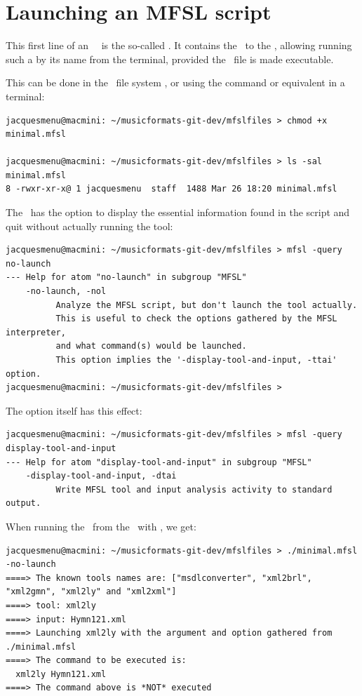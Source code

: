 \section{Launching an MFSL script}

This first line of an \mfslLang\ \script\ is the so-called . It contains the \filePath\ to the \mfslInterp, allowing running such a \script by its name from the terminal, provided the \script\ file is made executable.

This can be done in the \OS\ file system \GUI, or using the  command or equivalent in a terminal:
\begin{lstlisting}[language=Terminal]
jacquesmenu@macmini: ~/musicformats-git-dev/mfslfiles > chmod +x minimal.mfsl

jacquesmenu@macmini: ~/musicformats-git-dev/mfslfiles > ls -sal minimal.mfsl
8 -rwxr-xr-x@ 1 jacquesmenu  staff  1488 Mar 26 18:20 minimal.mfsl
\end{lstlisting}

The \mfslInterp\ has the  option to display the essential information found in the script and quit without actually running the tool:
\begin{lstlisting}[language=Terminal]
jacquesmenu@macmini: ~/musicformats-git-dev/mfslfiles > mfsl -query no-launch
--- Help for atom "no-launch" in subgroup "MFSL"
    -no-launch, -nol
          Analyze the MFSL script, but don't launch the tool actually.
          This is useful to check the options gathered by the MFSL interpreter,
          and what command(s) would be launched.
          This option implies the '-display-tool-and-input, -ttai' option.
jacquesmenu@macmini: ~/musicformats-git-dev/mfslfiles >
\end{lstlisting}

The  option itself has this effect:
\begin{lstlisting}[language=Terminal]
jacquesmenu@macmini: ~/musicformats-git-dev/mfslfiles > mfsl -query display-tool-and-input
--- Help for atom "display-tool-and-input" in subgroup "MFSL"
    -display-tool-and-input, -dtai
          Write MFSL tool and input analysis activity to standard output.
\end{lstlisting}

When running the  \script\ from the \CLI\ with , we get:
\begin{lstlisting}[language=Terminal]
jacquesmenu@macmini: ~/musicformats-git-dev/mfslfiles > ./minimal.mfsl -no-launch
====> The known tools names are: ["msdlconverter", "xml2brl", "xml2gmn", "xml2ly" and "xml2xml"]
====> tool: xml2ly
====> input: Hymn121.xml
====> Launching xml2ly with the argument and option gathered from ./minimal.mfsl
====> The command to be executed is:
  xml2ly Hymn121.xml
====> The command above is *NOT* executed
\end{lstlisting}

